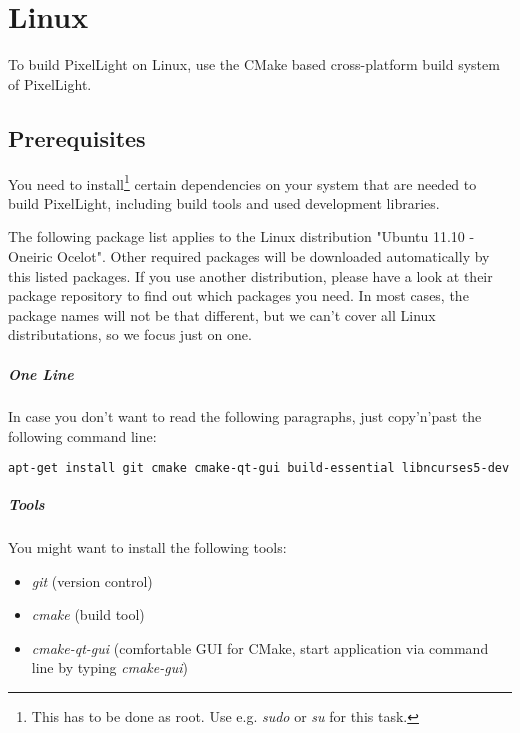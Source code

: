 \chapter{Linux}
To build PixelLight on Linux, use the CMake based cross-platform build system of PixelLight.




\section{Prerequisites}
You need to install\footnote{This has to be done as root. Use e.g. \emph{sudo} or \emph{su} for this task.} certain dependencies on your system that are needed to build PixelLight, including build tools and used development libraries.

The following package list applies to the Linux distribution "Ubuntu 11.10 - Oneiric Ocelot". Other required packages will be downloaded automatically by this listed packages. If you use another distribution, please have a look at their package repository to find out which packages you need. In most cases, the package names will not be that different, but we can't cover all Linux distributations, so we focus just on one.


\paragraph{One Line}
In case you don't want to read the following paragraphs, just copy'n'past the following command line:
\begin{lstlisting}[language=sh]
apt-get install git cmake cmake-qt-gui build-essential libncurses5-dev libxext-dev libxcursor-dev libdbus-1-dev libxxf86vm-dev libxrandr-dev libglu1-mesa-dev doxygen graphviz texlive texlive-science
\end{lstlisting}


\paragraph{Tools}
You might want to install the following tools:
\begin{itemize}
\item{\emph{git} (version control)}
\item{\emph{cmake} (build tool)}
\item{\emph{cmake-qt-gui} (comfortable GUI for CMake, start application via command line by typing \emph{cmake-gui})}
\end{itemize}

